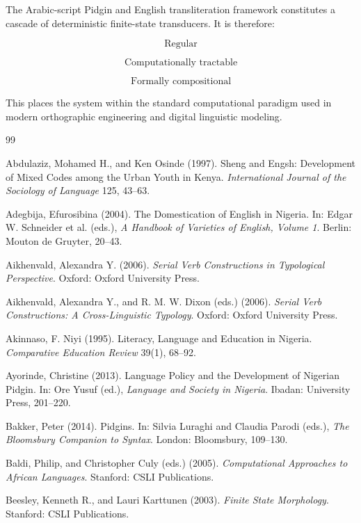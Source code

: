 \documentclass[12pt]{article}
\begin{document}
The Arabic-script Pidgin and English transliteration framework constitutes a cascade of deterministic finite-state transducers. It is therefore:

\[
\text{Regular}
\]

\[
\text{Computationally tractable}
\]

\[
\text{Formally compositional}
\]

This places the system within the standard computational paradigm used in modern orthographic engineering and digital linguistic modeling.

\newpage
\newpage
\begin{thebibliography}{99}

Abdulaziz, Mohamed H., and Ken Osinde (1997).
Sheng and Engsh: Development of Mixed Codes among the Urban Youth in Kenya.
\textit{International Journal of the Sociology of Language} 125, 43--63.

Adegbija, Efurosibina (2004).
The Domestication of English in Nigeria.
In: Edgar W. Schneider et al. (eds.),
\textit{A Handbook of Varieties of English, Volume 1}.
Berlin: Mouton de Gruyter, 20--43.

Aikhenvald, Alexandra Y. (2006).
\textit{Serial Verb Constructions in Typological Perspective}.
Oxford: Oxford University Press.

Aikhenvald, Alexandra Y., and R. M. W. Dixon (eds.) (2006).
\textit{Serial Verb Constructions: A Cross-Linguistic Typology}.
Oxford: Oxford University Press.

Akinnaso, F. Niyi (1995).
Literacy, Language and Education in Nigeria.
\textit{Comparative Education Review} 39(1), 68--92.

Ayorinde, Christine (2013).
Language Policy and the Development of Nigerian Pidgin.
In: Ore Yusuf (ed.),
\textit{Language and Society in Nigeria}.
Ibadan: University Press, 201--220.

Bakker, Peter (2014).
Pidgins.
In: Silvia Luraghi and Claudia Parodi (eds.),
\textit{The Bloomsbury Companion to Syntax}.
London: Bloomsbury, 109--130.

Baldi, Philip, and Christopher Culy (eds.) (2005).
\textit{Computational Approaches to African Languages}.
Stanford: CSLI Publications.

Beesley, Kenneth R., and Lauri Karttunen (2003).
\textit{Finite State Morphology}.
Stanford: CSLI Publications.


\end{thebibliography}
\end{document}

